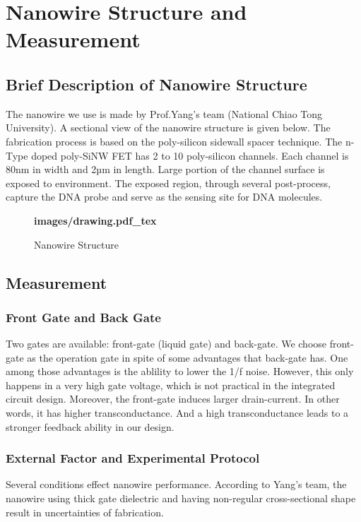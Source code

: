 \chapter{Nanowire Structure and Measurement}
\section{Brief Description of Nanowire Structure}
The nanowire we use is made by Prof.Yang's team (National Chiao Tong University)\cite{J8}.
A sectional view of the nanowire structure is given below.
The fabrication process is based on the poly-silicon sidewall spacer technique.
The n-Type doped poly-SiNW FET has 2 to 10 poly-silicon channels.
Each channel is 80nm in width and 2µm in length.
Large portion of the channel surface is exposed to environment.
The exposed region, through several post-process, capture the DNA probe and serve as the sensing site for DNA molecules.\cite{C5, C6}

\begin{figure}[!htbp]
    \centering
    {\selectfont\textbf{
        \def\svgwidth{5.0cm}
        \fontsize{6}{7}\selectfont
         {images/drawing.pdf_tex}
    }}
    \fontsize{6}{7}\selectfont
    \caption{Nanowire Structure}
    \label{fig:res}
\end{figure}



\section{Measurement}

\subsection*{Front Gate and Back Gate}
Two gates are available: front-gate (liquid gate) and back-gate.
We choose front-gate as the operation gate in spite of some advantages that back-gate has.
One among those advantages is the ablility to lower the 1/f noise.\cite{C7}
However, this only happens in a very high gate voltage, which is not practical in the integrated circuit design.
Moreover, the front-gate induces larger drain-current.
In other words, it has higher transconductance. And a high transconductance leads to a stronger feedback ability in our design.




\subsection{External Factor and Experimental Protocol}
Several conditions effect nanowire performance.
According to Yang's team, the nanowire using thick gate dielectric and having non-regular cross-sectional
shape result in uncertainties of fabrication. \cite{C6}



 

